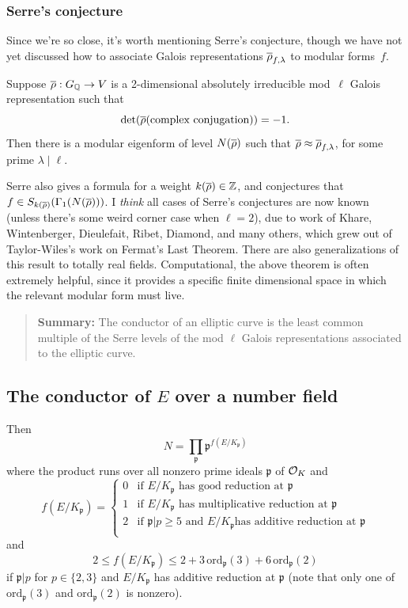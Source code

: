 \documentclass{book}
\begin{document}
\subsubsection{Serre's conjecture}
Since we're so close, it's worth mentioning Serre's conjecture,
though we have not yet discussed how to
associate Galois representations $\overline{\rho}_{f,\lambda}$
to modular forms~$f$.
\begin{theorem}
Suppose $\overline{\rho}:G_{\mathbb{Q}}\to V$
is a 2-dimensional absolutely irreducible
mod~$\ell$ Galois representation such that
$$\det(\overline{\rho}(\text{\rm complex conjugation})) =-1.$$
Then there is a modular eigenform of level
$N(\overline{\rho})$ such that $\overline{\rho} \approx \overline{\rho}_{f,\lambda}$,
for some prime $\lambda\mid \ell$.
\end{theorem}
Serre also gives a formula for a weight $k(\overline{\rho})\in\mathbb{Z}$, and
conjectures that $f\in S_{k(\overline{\rho})}(\Gamma_1(N(\overline{\rho})))$.
I {\em think} all cases of Serre's conjectures are now known
(unless there's some weird corner case when $\ell=2$), due to
work of Khare, Wintenberger, Dieulefait, Ribet, Diamond, and many
others, which grew out of Taylor-Wiles's work on Fermat's Last Theorem.
There are also generalizations of this result to totally real
fields.  Computational, the above theorem is often extremely
helpful, since it provides a specific finite dimensional space
in which the relevant modular form must live.


\begin{quote}
{\bf Summary:} The conductor of an elliptic curve is the least common multiple
of the Serre levels of the mod $\ell$ Galois representations associated to the
elliptic curve.
\end{quote}

\subsection{The conductor of $E$ over a number field}\label{sec:condnf}

Then
$$
N = \prod_{\mathfrak{p}} \mathfrak{p}^{f(E/K_{\mathfrak{p}})}
$$
where the product runs over all nonzero prime ideals $\mathfrak{p}$
of $\mathcal{O}_K$ and
$$
f(E/K_\mathfrak{p}) = \left\{\begin{array}{ll}
0 & \text{if $E/K_{\mathfrak{p}}$ has good reduction at $\mathfrak{p}$} \\
1 & \text{if $E/K_{\mathfrak{p}}$ has multiplicative
reduction at $\mathfrak{p}$} \\
2 & \text{if $\mathfrak{p}|p \geq 5$ and $E/K_{\mathfrak{p}}$
has additive reduction at $\mathfrak{p}$} \\
\end{array}\right.
$$
and
$$
2 \leq f(E/K_{\mathfrak{p}}) \leq 2 + 3 \, \mathrm{ord}_{\mathfrak{p}}(3)
 + 6 \, \mathrm{ord}_{\mathfrak{p}}(2)
$$
if $\mathfrak{p}|p$ for $p \in \{2, 3\}$ and $E/K_{\mathfrak{p}}$ has
additive reduction at $\mathfrak{p}$ (note that only one of
$\mathrm{ord}_{\mathfrak{p}}(3)$ and $\mathrm{ord}_{\mathfrak{p}}(2)$ is
nonzero).
\end{document}
